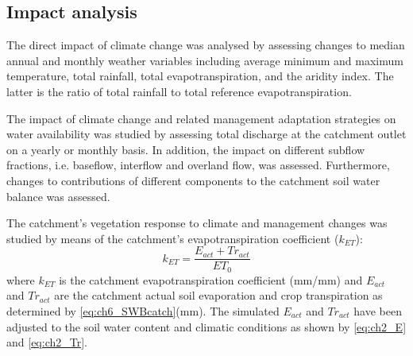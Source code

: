 \subsection{Impact analysis}
The direct impact of climate change was analysed by assessing changes to median annual and monthly weather variables including average minimum and maximum temperature, total rainfall, total evapotranspiration, and the aridity index. The latter is the ratio of total rainfall to total reference evapotranspiration.

The impact of climate change and related management adaptation strategies on water availability was studied by assessing total discharge at the catchment outlet on a yearly or monthly basis. In addition, the impact on different subflow fractions, i.e. baseflow, interflow and overland flow, was assessed. Furthermore, changes to contributions of different components to the catchment soil water balance was assessed.

The catchment's vegetation response to climate and management changes was studied by means of the catchment's evapotranspiration coefficient ($k_{ET}$):
\begin{equation}
 k_{ET}=\dfrac{E_{act}+Tr_{act}}{ET_{0}}
  \label{eq:ch7_kET}
\end{equation}
where $k_{ET}$ is the catchment evapotranspiration coefficient (\si{mm/mm}) and $E_{act}$ and $Tr_{act}$ are the catchment actual soil evaporation and crop transpiration as determined by \autoref{eq:ch6_SWBcatch}(\si{mm}). The simulated $E_{act}$ and $Tr_{act}$ have been adjusted to the soil water content and climatic conditions as shown by \autoref{eq:ch2_E} and \autoref{eq:ch2_Tr}.


